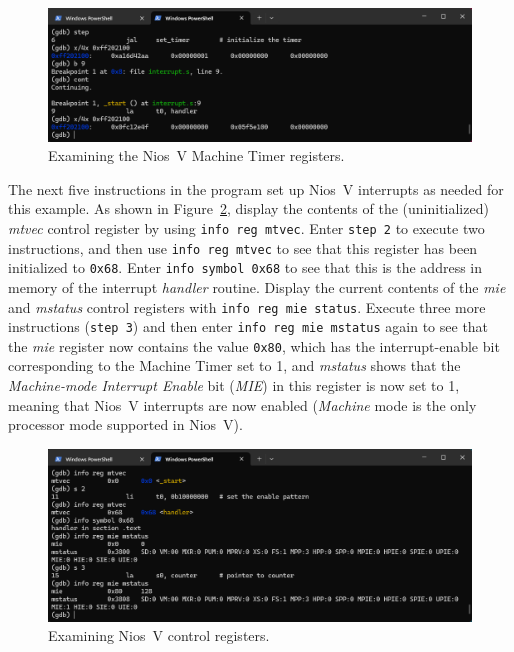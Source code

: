 \documentclass[11pt, twoside, pdftex]{article}
\begin{document}
\begin{figure}[h]
    \begin{center}
        \includegraphics[scale=.6]{figures/interrupt_s2.png}
        \caption{Examining the Nios~V Machine Timer registers.}
        \label{fig:interrupt_s2}
    \end{center}
\end{figure}

The next five instructions in the program set up Nios~V interrupts as needed for this
example. As shown in Figure~\ref{fig:interrupt_s3}, display
the contents of the (uninitialized) {\it mtvec} control register by using
\texttt{info reg mtvec}. Enter \texttt{step 2} to execute two instructions, and
then use \texttt{info reg mtvec} to see that this register has been initialized to
\texttt{0x68}. Enter \texttt{info symbol 0x68} to see that this is the address in memory of the 
interrupt {\it handler} routine. 
Display the current contents of the {\it mie} and {\it mstatus} control registers
with \texttt{info reg mie status}. Execute three more instructions (\texttt{step 3}) and
then enter \texttt{info reg mie mstatus} again to see that the {\it mie} register now
contains the value \texttt{0x80}, which has the interrupt-enable bit corresponding to the
Machine Timer set to 1, and {\it mstatus} shows that the {\it Machine-mode Interrupt Enable} bit
({\it MIE}) in this register is now set to 1, meaning that Nios~V interrupts are now
enabled ({\it Machine} mode is the only processor mode supported in Nios~V).

\begin{figure}[h]
    \begin{center}
        \includegraphics[scale=.6]{figures/interrupt_s3.png}
        \caption{Examining Nios~V control registers.}
        \label{fig:interrupt_s3}
    \end{center}
\end{figure}
\end{document}
